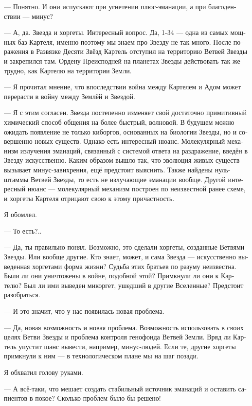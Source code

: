 \documentclass[a4paper,12pt,fleqn]{book}\usepackage{polyglossia}\setdefaultlanguage[babelshorthands=true]{russian}\setotherlanguage{english}\defaultfontfeatures{Ligatures=TeX,Mapping=tex-text}\usepackage{xcolor}\newcommand{\ml}[3]{#2}
\begin{document}
{--- Понятно.
И они испускают при угнетении плюс-эманации, а при благоденствии --- минус?

--- А, да.
Звезда и хоргеты.
Интересный вопрос.
Да, 1-34 --- одна из самых мощных баз Картеля, именно поэтому мы знаем про Звезду не так много.
После поражения в Развязке Десяти Звёзд Картель отступил на территорию Ветвей Звезды и закрепился там.
Ордену Преисподней на планетах Звезды действовать так же трудно, как Картелю на территории Земли.

--- Я прочитал мнение, что впоследствии война между Картелем и Адом может перерасти в войну между Землёй и Звездой.

--- Я с этим согласен.
Звезда постепенно изменяет свой достаточно примитивный химический способ общения на более быстрый, волновой.
В будущем можно ожидать появление не только киборгов, основанных на биологии Звезды, но и совершенно новых существ.
Однако есть интересный нюанс.
Молекулярный механизм излучения эманаций, связанный с системой ответа на раздражение, введён в Звезду искусственно.
Каким образом вышло так, что эволюция живых существ вызывает минус-завихрения, ещё предстоит выяснить.
Также найдены нуль-штаммы Ветвей Звезды, то есть не излучающие эманации вообще.
Другой интересный нюанс --- молекулярный механизм построен по неизвестной ранее схеме, и хоргеты Картеля отрицают свою к этому причастность.

Я обомлел.

--- То есть?..

--- Да, ты правильно понял.
Возможно, это сделали хоргеты, созданные Ветвями Звезды.
Или вообще другие.
Кто знает, может, и сама Звезда --- искусственно выведенная хоргетами форма жизни?
Судьба этих братьев по разуму неизвестна.
Были ли они уничтожены в войне, подобной этой?
Примкнули ли они к Картелю?
Был ли ими выведен микоргет, ушедший в другие Вселенные?
Предстоит разобраться.

--- И это значит, что у нас появилась новая проблема.

--- Да, новая возможность и новая проблема.
Возможность использовать в своих целях Ветви Звезды и проблема контроля генофонда Ветвей Земли.
Вряд ли Картель упустит шанс вывести, например, минус-людей.
Если те, другие хоргеты примкнули к ним --- в технологическом плане мы на шаг позади.

Я обхватил голову руками.

--- А всё-таки, что мешает создать стабильный источник эманаций и оставить сапиентов в покое?
Сколько проблем было бы решено!

}
\end{document}
